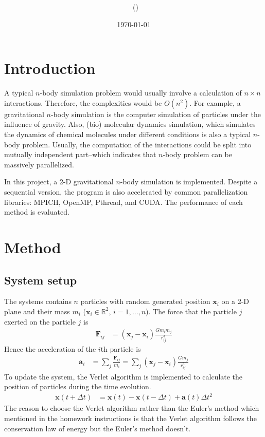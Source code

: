 \documentclass[twoside,12pt]{article}
\title{{\lms \Code \ \Ass}}
\author{\lms \name \ (\href{mailto:\mail}{\mail})}
\date{\sffamily \today}
\makeatletter
\newcommand{\RR}{\mathbb{R}}
\theoremstyle{definition}
\theoremstyle{remark}
\renewcommand{\maketitle}{\bgroup\setlength{\parindent}{0pt}
\begin{flushleft}
  \textbf{\Large\@title}

  \@author
\end{flushleft}\egroup
}
\makeatother
\begin{document}
\maketitle
\thispagestyle{title}

\section{Introduction}
A typical $n$-body simulation problem would usually involve a calculation of 
$n\times n$ interactions.
Therefore, the complexities would be $O(n^2)$.
For example, a gravitational $n$-body simulation is the computer simulation of
particles under the influence of gravity.
Also, (bio) molecular dynamics simulation, which simulates the dynamics of
chemical molecules under different conditions is also a typical $n$-body
problem.
Usually, the computation of the interactions could be split into mutually
independent part--which indicates that $n$-body problem can be massively
parallelized.

In this project, a 2-D gravitational $n$-body simulation is implemented.
Despite a sequential version, the program is also accelerated by
common parallelization libraries: MPICH, OpenMP, Pthread, and CUDA.
The performance of each method is evaluated.




\section{Method}
\subsection{System setup}
The systems contains $n$ particles with random generated position $\mathbf{x}_i$ 
on a 2-D plane and their mass $m_i$
($\mathbf{x}_i\in\RR^2$, $i=1,\dots,n$).
The force that the particle $j$ exerted on the particle $j$ is
\begin{align*}
    \mathbf{F}_{ij} &= (\mathbf{x}_j - \mathbf{x}_i)\frac{Gm_im_j}{r_{ij}^3}
\end{align*}
Hence the acceleration of the $i$th particle is
\begin{align*}
    \mathbf{a}_i &= \sum_j \frac{\mathbf{F}_{ij}}{m_i}
    = \sum_j (\mathbf{x}_j - \mathbf{x}_i)\frac{Gm_j}{r_{ij}^3}
\end{align*}
To update the system, the Verlet algorithm is implemented to calculate
the position of particles during the time evolution.
\begin{align*}
    \mathbf{x}(t+\Delta t) &= 
    \mathbf{x}(t) - \mathbf{x}(t-\Delta t) + \mathbf{a}(t)\Delta t^2
\end{align*}
The reason to choose the Verlet algorithm rather than the Euler's method
which mentioned in the homework instructions is that
the Verlet algorithm follows the conservation law of energy but
the Euler's method doesn't.
\end{document}
